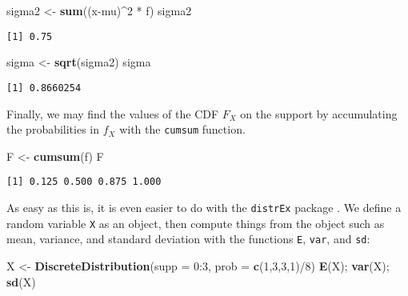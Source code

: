 \documentclass[]{book}
\newenvironment{Shaded}{\begin{snugshade}}{\end{snugshade}}
\newcommand{\KeywordTok}[1]{\textcolor[rgb]{0.13,0.29,0.53}{\textbf{{#1}}}}
\newcommand{\DataTypeTok}[1]{\textcolor[rgb]{0.13,0.29,0.53}{{#1}}}
\newcommand{\DecValTok}[1]{\textcolor[rgb]{0.00,0.00,0.81}{{#1}}}
\newcommand{\StringTok}[1]{\textcolor[rgb]{0.31,0.60,0.02}{{#1}}}
\newcommand{\NormalTok}[1]{{#1}}
\numberwithin{equation}{chapter}
\numberwithin{figure}{chapter}
\theoremstyle{plain}
\theoremstyle{definition}
\theoremstyle{remark}
\theoremstyle{definition}
\theoremstyle{definition}
\theoremstyle{remark}
\begin{document}
\begin{Shaded}
\begin{Highlighting}[]
\NormalTok{sigma2 <-}\StringTok{ }\KeywordTok{sum}\NormalTok{((x-mu)^}\DecValTok{2} \NormalTok{*}\StringTok{ }\NormalTok{f)}
\NormalTok{sigma2}
\end{Highlighting}
\end{Shaded}

\begin{verbatim}
[1] 0.75
\end{verbatim}

\begin{Shaded}
\begin{Highlighting}[]
\NormalTok{sigma <-}\StringTok{ }\KeywordTok{sqrt}\NormalTok{(sigma2)}
\NormalTok{sigma}
\end{Highlighting}
\end{Shaded}

\begin{verbatim}
[1] 0.8660254
\end{verbatim}

Finally, we may find the values of the CDF \(F_{X}\) on the support by
accumulating the probabilities in \(f_{X}\) with the \texttt{cumsum}
function.

\begin{Shaded}
\begin{Highlighting}[]
\NormalTok{F <-}\StringTok{ }\KeywordTok{cumsum}\NormalTok{(f)}
\NormalTok{F}
\end{Highlighting}
\end{Shaded}

\begin{verbatim}
[1] 0.125 0.500 0.875 1.000
\end{verbatim}

As easy as this is, it is even easier to do with the \texttt{distrEx}
package \autocite{distrEx}. We define a random variable \texttt{X} as an
object, then compute things from the object such as mean, variance, and
standard deviation with the functions \texttt{E}, \texttt{var}, and
\texttt{sd}:

\begin{Shaded}
\begin{Highlighting}[]
\NormalTok{X <-}\StringTok{ }\KeywordTok{DiscreteDistribution}\NormalTok{(}\DataTypeTok{supp =} \DecValTok{0}\NormalTok{:}\DecValTok{3}\NormalTok{, }\DataTypeTok{prob =} \KeywordTok{c}\NormalTok{(}\DecValTok{1}\NormalTok{,}\DecValTok{3}\NormalTok{,}\DecValTok{3}\NormalTok{,}\DecValTok{1}\NormalTok{)/}\DecValTok{8}\NormalTok{)}
\KeywordTok{E}\NormalTok{(X); }\KeywordTok{var}\NormalTok{(X); }\KeywordTok{sd}\NormalTok{(X)}
\end{Highlighting}
\end{Shaded}
\end{document}
